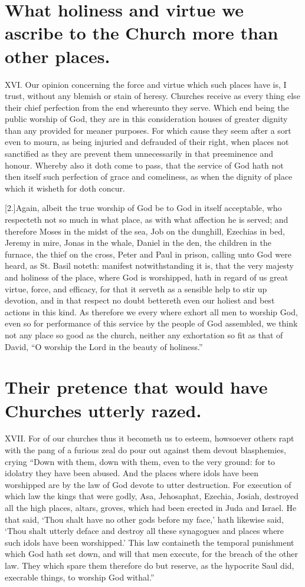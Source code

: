 \section*{What holiness and virtue we ascribe to the Church more than other places.}
XVI. Our opinion concerning the force and virtue which such places have is, I trust, without any blemish or stain of heresy. Churches receive as every thing else their chief perfection from the end whereunto they serve. Which end being the public worship of God, they are in this consideration houses of greater dignity than any provided for meaner purposes. For which cause they seem after a sort even to mourn, as being injuried and defrauded of their right, when places not sanctified as they are prevent them unnecessarily in that preeminence and honour. Whereby also it doth come to pass, that the service of God hath not then itself such perfection of grace and comeliness, as when the dignity of place which it wisheth for doth concur.

[2.]Again, albeit the true worship of God be to God in itself acceptable, who respecteth not so much in what place, as with what affection he is served; and therefore Moses in the midst of the sea, Job on the dunghill, Ezechias in bed, Jeremy in mire, Jonas in the whale, Daniel in the den, the children in the furnace, the thief on the cross, Peter and Paul in prison, calling unto God were heard, as St. Basil noteth: manifest notwithstanding it is, that the very majesty and holiness of the place, where God is worshipped, hath in regard of us great virtue, force, and efficacy, for that it serveth as a sensible help to stir up devotion, and in that respect no doubt bettereth even our holiest and best actions in this kind. As therefore we every where exhort all men to  worship God,
 even so for performance of this service by the people of God assembled, we think not any place so good as the church, neither any exhortation so fit as that of David, “O worship the Lord in the beauty of holiness.”


\section*{Their pretence that would have Churches utterly razed.}
XVII. For of our churches thus it becometh us to esteem, howsoever others rapt with the pang of a furious zeal do pour out against them devout blasphemies, crying “Down with them, down with them, even to the very ground: for to idolatry they have been abused. And the places where idols have been worshipped are by the law of God devote to utter destruction. For execution of which law the kings that were godly, Asa, Jehosaphat, Ezechia, Josiah, destroyed all the high places, altars, groves, which had been erected in Juda and Israel. He that said, ‘Thou shalt have no other gods before my face,’ hath likewise said, ‘Thou shalt utterly deface and destroy all these synagogues and places where such idols have been worshipped.’ This law containeth the temporal punishment which God hath set down, and will that men execute, for the breach of the other law. They which spare them therefore do but reserve, as the hypocrite Saul did, execrable things, to worship God withal.”


